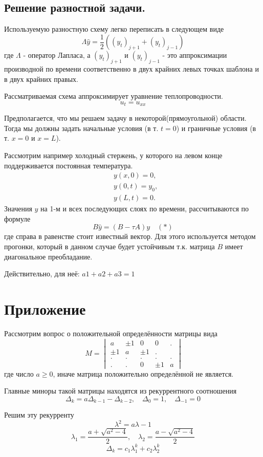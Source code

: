 \documentclass[12pt,a4paper]{article}
\renewcommand{\geq}{\geqslant}
\begin{document}
\subsection{Решение разностной задачи.}
Используемую разностную схему легко переписать в следующем виде
$$\Lambda\hat{y} = \frac{1}{2}((y_{t})_{j+1} + (y_{t})_{j-1})$$
где $\Lambda$ - оператор Лапласа, а $(y_{t})_{j+1}$ и $(y_{t})_{j-1}$ - это аппроксимации производной по времени соответственно в двух крайних левых точках шаблона и в двух крайних правых.

Рассматриваемая схема аппроксимирует уравнение теплопроводности.
$$u_{t} = u_{xx}$$

Предполагается, что мы решаем задачу в некоторой(прямоугольной) области. Тогда мы должны задать начальные условия (в т. $t = 0$) и граничные условия (в т. $x = 0$ и $x = L$). 

Рассмотрим например холодный стержень, у которого на левом конце поддерживается постоянная температура.
\begin{align*}
&y(x, 0) = 0, \\
&y(0, t) = y_0,\\
&y(L, t) = 0.
\end{align*}
Значения $y$ на 1-м и всех последующих слоях по времени, рассчитываются по формуле $$B\hat{y} = (B - \tau A)y \quad (*)$$ где справа в равенстве стоит известный вектор.
Для этого используется методом прогонки, который в данном случае будет устойчивым т.к. матрица $B$ имеет диагональное преобладание.

Действительно, для неё: $a1 + a2 + a3 = 1$

\section{Приложение}

Рассмотрим вопрос о положительной определённости матрицы вида  $$\ M  = \begin{vmatrix}
a & \pm1 & 0 & 0&.\\
\pm1 & a & \pm1 & .\\
.&.&.&.&.\\
.&.&0&\pm1&a 
\end{vmatrix}$$
где число $a\geq0$,  иначе матрица положительно определённой не является.

Главные миноры такой матрицы находятся из рекуррентного соотношения 
$$\Delta_k = a\Delta_{k-1} - \Delta_{k-2}, \quad \Delta_0 = 1,\quad \Delta_{-1} = 0 $$

Решим эту рекурренту $$\lambda^2= a\lambda-1$$
$$\lambda_1 = \frac{a+\sqrt{a^2-4}}{2},\quad\lambda_2 = \frac{a-\sqrt{a^2-4}}{2}$$
$$\Delta_k = c_1\lambda_1^k + c_2\lambda_2^k$$
\end{document}
